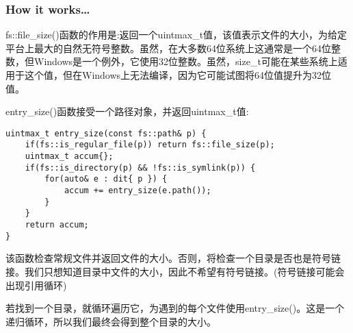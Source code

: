 \subsubsection{How it works…}

fs::file\_size()函数的作用是:返回一个uintmax\_t值，该值表示文件的大小，为给定平台上最大的自然无符号整数。虽然，在大多数64位系统上这通常是一个64位整数，但Windows是一个例外，它使用32位整数。虽然，size\_t可能在某些系统上适用于这个值，但在Windows上无法编译，因为它可能试图将64位值提升为32位值。

entry\_size()函数接受一个路径对象，并返回uintmax\_t值:

\begin{lstlisting}[style=styleCXX]
uintmax_t entry_size(const fs::path& p) {
	if(fs::is_regular_file(p)) return fs::file_size(p);
	uintmax_t accum{};
	if(fs::is_directory(p) && !fs::is_symlink(p)) {
		for(auto& e : dit{ p }) {
			accum += entry_size(e.path());
		}
	}
	return accum;
}
\end{lstlisting}

该函数检查常规文件并返回文件的大小。否则，将检查一个目录是否也是符号链接。我们只想知道目录中文件的大小，因此不希望有符号链接。(符号链接可能会出现引用循环)

若找到一个目录，就循环遍历它，为遇到的每个文件使用entry\_size()。这是一个递归循环，所以我们最终会得到整个目录的大小。


























